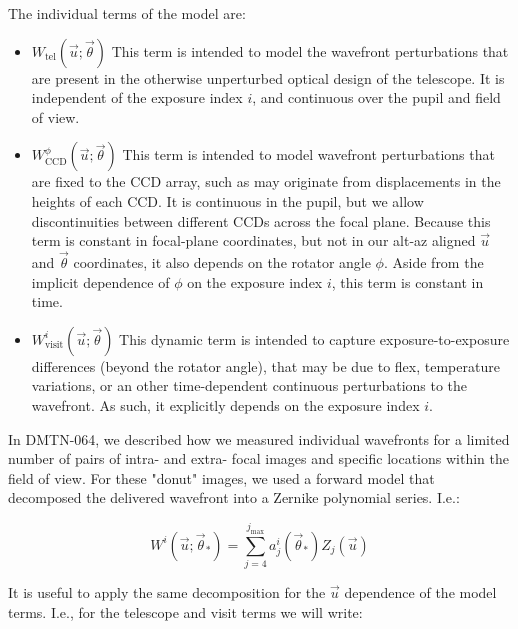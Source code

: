 \documentclass{article}
\begin{document}
The individual terms of the model are:

\begin{itemize}

  \item $W_\mathrm{tel}\left(\vec{u}; \vec{\theta}\right)$  This term is
  intended to model the wavefront perturbations that are present in the
  otherwise unperturbed optical design of the telescope.  It is independent of
  the exposure index $i$, and continuous over the pupil and field of view.

  \item $W_\mathrm{CCD}^\phi\left(\vec{u}; \vec{\theta}\right)$  This term is
  intended to model wavefront perturbations that are fixed to the CCD array,
  such as may originate from displacements in the heights of each CCD. It is
  continuous in the pupil, but we allow discontinuities between different CCDs
  across the focal plane.  Because this term is constant in focal-plane
  coordinates, but not in our alt-az aligned $\vec{u}$ and $\vec{\theta}$
  coordinates, it also depends on the rotator angle $\phi$.  Aside from the
  implicit dependence of $\phi$ on the exposure index $i$, this term is constant
  in time.

  \item $W_\mathrm{visit}^i\left(\vec{u}; \vec{\theta}\right)$  This dynamic
  term is intended to capture exposure-to-exposure differences (beyond the
  rotator angle), that may be due to flex, temperature variations, or an other
  time-dependent continuous perturbations to the wavefront.  As such, it
  explicitly depends on the exposure index $i$.

\end{itemize}

In DMTN-064, we described how we measured individual wavefronts for a limited
number of pairs of intra- and extra- focal images and specific locations within
the field of view.  For these "donut" images, we used a forward model that
decomposed the delivered wavefront into a Zernike polynomial series.  I.e.:

\begin{equation}
    W^i\left(\vec{u}; \vec{\theta}_\ast\right) = \sum_{j=4}^{j_\mathrm{max}} a_j^i(\vec{\theta}_\ast) Z_j(\vec{u})
\end{equation}

It is useful to apply the same decomposition for the $\vec{u}$ dependence of the
model terms.  I.e., for the telescope and visit terms we will write:
\end{document}
